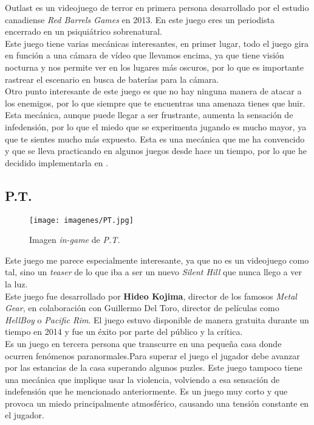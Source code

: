 Outlast es un videojuego de terror en primera persona desarrollado por el estudio canadiense \textit{Red Barrels Games} en 2013. En este juego eres un periodista encerrado en un psiquiátrico sobrenatural. 
\\

Este juego tiene varias mecánicas interesantes, en primer lugar, todo el juego gira en función a una cámara de vídeo que llevamos encima, ya que tiene visión nocturna y nos permite ver en los lugares más oscuros, por lo que es importante rastrear el escenario en busca de baterías para la cámara.
\\

Otro punto interesante de este juego es que no hay ninguna manera de atacar a los enemigos, por lo que siempre que te encuentras una amenaza tienes que huir. Esta mecánica, aunque puede llegar a ser frustrante, aumenta la sensación de infedensión, por lo que el miedo que se experimenta jugando es mucho mayor, ya que te sientes mucho más expuesto. Esta es una mecánica que me ha convencido y que se lleva practicando en algunos juegos desde hace un tiempo, por lo que he decidido implementarla en \textbf{\nombreJuego}.
\\

\subsection{P.T.}

\begin{figure}
	\begin{center}
		\texttt{[image: imagenes/PT.jpg]}
		\caption{Imagen \textit{in-game} de \textit{P.T.}}
		\label{PT}
	\end{center}
\end{figure}

Este juego me parece especialmente interesante, ya que no es un videojuego como tal, sino un \textit{teaser} de lo que iba a ser un nuevo \textit{Silent Hill} que nunca llego a ver la luz.
\\

Este juego fue desarrollado por \textbf{Hideo Kojima}, director de los famosos \textit{Metal Gear}, en colaboración con Guillermo Del Toro, director de películas como \textit{HellBoy} o \textit{Pacific Rim}. El juego estuvo disponible de manera gratuita durante un tiempo en 2014 y fue un éxito por parte del público y la crítica.
\\

Es un juego en tercera persona que transcurre en una pequeña casa donde ocurren fenómenos paranormales.Para superar el juego el jugador debe avanzar por las estancias de la casa superando algunos puzles. Este juego tampoco tiene una mecánica que implique usar la violencia, volviendo a esa sensación de indefensión que he mencionado anteriormente. Es un juego muy corto y que provoca un miedo principalmente atmosférico, causando una tensión constante en el jugador.
\\

